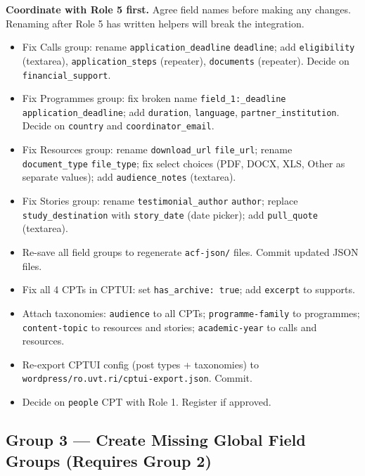 \documentclass[12pt,a4paper]{article}
\begin{document}
\begin{yellowbox}
\textbf{Coordinate with Role 5 first.} Agree field names before making any changes.
Renaming after Role 5 has written helpers will break the integration.
\end{yellowbox}

\begin{itemize}
    \item[$\square$] Fix Calls group: rename \texttt{application\_deadline} \textrightarrow{} \texttt{deadline}; add \texttt{eligibility} (textarea), \texttt{application\_steps} (repeater), \texttt{documents} (repeater). Decide on \texttt{financial\_support}.
    \item[$\square$] Fix Programmes group: fix broken name \texttt{field\_1:\_deadline} \textrightarrow{} \texttt{application\_deadline}; add \texttt{duration}, \texttt{language}, \texttt{partner\_institution}. Decide on \texttt{country} and \texttt{coordinator\_email}.
    \item[$\square$] Fix Resources group: rename \texttt{download\_url} \textrightarrow{} \texttt{file\_url}; rename \texttt{document\_type} \textrightarrow{} \texttt{file\_type}; fix select choices (PDF, DOCX, XLS, Other as separate values); add \texttt{audience\_notes} (textarea).
    \item[$\square$] Fix Stories group: rename \texttt{testimonial\_author} \textrightarrow{} \texttt{author}; replace \texttt{study\_destination} with \texttt{story\_date} (date picker); add \texttt{pull\_quote} (textarea).
    \item[$\square$] Re-save all field groups to regenerate \texttt{acf-json/} files. Commit updated JSON files.
    \item[$\square$] Fix all 4 CPTs in CPTUI: set \texttt{has\_archive: true}; add \texttt{excerpt} to supports.
    \item[$\square$] Attach taxonomies: \texttt{audience} to all CPTs; \texttt{programme-family} to programmes; \texttt{content-topic} to resources and stories; \texttt{academic-year} to calls and resources.
    \item[$\square$] Re-export CPTUI config (post types + taxonomies) to \texttt{wordpress/ro.uvt.ri/cptui-export.json}. Commit.
    \item[$\square$] Decide on \texttt{people} CPT with Role 1. Register if approved.
\end{itemize}

\subsection{Group 3 --- Create Missing Global Field Groups (Requires Group 2)}
\end{document}
